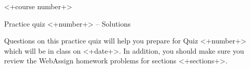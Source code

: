 
\medskip
\begin{center}
  <+course number+>

  \Large Practice quiz <+number+>
  \ifprintanswers
    -- Solutions
  \else
  \fi
\end{center}
\hrulefill
\bigskip

Questions on this practice quiz will help you prepare for Quiz <+number+> which will be in class on <+date+>.
In addition, you should make sure you review the WebAssign homework problems for sections <+sections+>.

